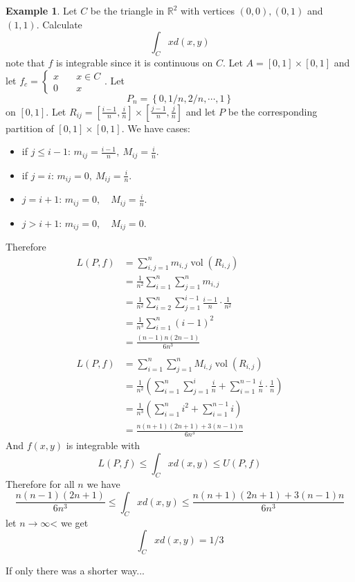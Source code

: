 \documentclass[11pt,a4paper]{article}
\theoremstyle{definition}
\newtheorem{example}[definition]{Example}
\theoremstyle{plain}
\theoremstyle{remark}
\newcommand{\R}{\mathbb{R}}
\renewcommand{\set}[1]{\left\{ #1 \right\}}
\newcommand{\vol}{\operatorname{vol}}
\begin{document}
\begin{example}
    Let $C$ be the triangle in $\R^2$ with vertices $(0,0), (0,1)$ and $(1,1)$. Calculate 
    $$\int_C x d(x,y)$$
    note that $f$ is integrable since it is continuous on $C$. Let $A = [0,1] \times [0,1]$ and let 
    $f_c = \begin{cases}
        x \quad & x \in C \\
        0 \quad & x
    \end{cases}$. Let 
    $$P_n = \set{0, 1/n, 2/n, \cdots, 1}$$
    on $[0,1]$. Let $R_{ij} = [\frac{i-1}{n}, \frac{i}{n}] \times [\frac{j-1}{n},\frac{j}{n}]$ 
    and let $P$ be the corresponding partition of $[0,1] \times [0,1]$. We have cases: 
    \begin{itemize}
        \item if $j \le i-1$: $m_{ij} = \frac{i-1}{n}, \ M_{ij} = \frac{i}{n}$. 
        \item if $j = i$: $m_{ij} = 0, \ M_{ij} = \frac{i}{n}$. 
        \item $j = i+1$: $m_{ij} = 0, \quad M_{ij} = \frac{i}{n}$. 
        \item $j > i+1$: $m_{ij} = 0, \quad M_{ij} = 0$.
    \end{itemize}
    Therefore 
    \begin{align*}
        L(P,f) &= \sum_{i,j = 1}^n m_{i,j} \vol (R_{i,j}) \\
        &= \frac{1}{n^2} \sum_{i = 1}^n \sum_{j=1}^n m_{i,j} \\
        &= \frac{1}{n^2} \sum_{i=2}^n \sum_{j=1}^{i-1} \frac{i-1}{n} \cdot \frac{1}{n^2} \\
        &= \frac{1}{n^3} \sum_{i=1}^n (i-1)^2 \\
        &= \frac{(n-1)n(2n-1)}{6n^3} \\
        \\
        L(P,f) &= \sum_{i=1}^n \sum_{j=1}^n M_{i,j} \vol (R_{i,j} ) \\
        &= \frac{1}{n^2} \left(\sum_{i=1}^{n} \sum_{j=1}^{i} \frac{i}{n} + \sum_{i=1}^{n-1} \frac{i}{n} \cdot \frac{1}{n}\right) \\
        &= \frac{1}{n^3} \left(\sum_{i=1}^n i^2 + \sum_{i=1}^{n-1} i\right) \\
        &= \frac{n(n+1)(2n+1) + 3(n-1)n}{6n^3} 
    \end{align*} 
    And $f(x,y)$ is integrable with 
    $$L(P,f) \le \int_C x d(x,y) \le U(P,f)$$
    Therefore for all $n$ we have 
    $$\frac{n(n-1)(2n+1)}{6n^3} \le \int_C x d(x,y) \le \frac{n(n+1)(2n+1) + 3(n-1)n}{6n^3} $$
    let $n \to \infty$< we get 
    $$\int_C xd(x,y) = 1/3$$
    
    If only there was a shorter way...
\end{example}
\end{document}
